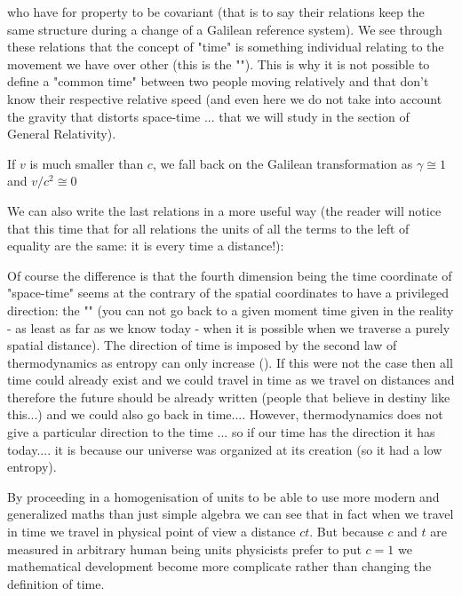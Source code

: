 	who have for property to be covariant (that is to say their relations keep the same structure during a change of a Galilean reference system). We see through these relations that the concept of "time" is something individual relating to the movement we have over other (this is the ""). This is why it is not possible to define a "common time" between two people moving relatively and that don't know their respective relative speed (and even here we do not take into account the gravity that distorts space-time ... that we will study in the section of General Relativity).
	\begin{tcolorbox}[title=Remark,colframe=black,arc=10pt]
	If $v$ is much smaller than $c$, we fall back on the Galilean transformation as $\gamma\cong 1$ and $v/c^2\cong 0$
	\end{tcolorbox}
	We can also write the last relations in a more useful way (the reader will notice that this time that for all relations the units of all the terms to the left of equality are the same: it is every time a distance!):
	
	Of course the difference is that the fourth dimension being the time coordinate of "space-time" seems at the contrary of the spatial coordinates to have a privileged direction: the "" (you can not go back to a given moment time given in the reality - as least as far as we know today - when it is possible when we traverse a purely spatial distance). The direction of time is imposed by the second law of thermodynamics as entropy can only increase (). If this were not the case then all time could already exist and we could travel in time as we travel on distances and therefore the future should be already written (people that believe in destiny like this...) and we could also go back in time.... However, thermodynamics does not give a particular direction to the time ... so if our time has the direction it has today.... it is because our universe was organized at its creation (so it had a low entropy).
	
	By proceeding in a homogenisation of units to be able to use more modern and generalized maths than just simple algebra we can see that in fact when we travel in time we travel in physical point of view a distance $ct$. But because $c$ and $t$ are measured in arbitrary human being units physicists prefer to put $c=1$ we mathematical development become more complicate rather than changing the definition of time.
	
